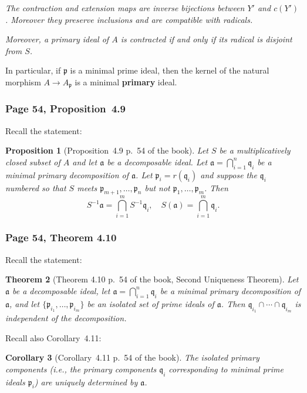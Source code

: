 \documentclass[12pt,letterpaper]{article}%
\newcommand{\mf}{\mathfrak}
\newcommand{\aaa}{\mf a}
\newcommand{\ppp}{\mf p}
\newcommand{\qqq}{\mf q}
\newcommand{\nn}{\noindent}
\newtheorem{thm}{Theorem}%
\newtheorem{cor}[thm]{Corollary}
\newtheorem{prop}[thm]{Proposition}
\begin{document}
\nn\emph{The contraction and extension maps are inverse bijections between $Y'$ and $c(Y')$. Moreover they preserve inclusions and are compatible with radicals.} 

\nn\emph{Moreover, a primary ideal of $A$ is contracted if and only if its radical is disjoint from $S$.}

In particular, if $\ppp$ is a minimal prime ideal, then the kernel of the natural morphism $A\to A_\ppp$ is a minimal \textbf{primary} ideal.


\subsubsection{Page 54, Proposition~4.9}%

Recall the statement:

\begin{prop}[Proposition~4.9 p.~54 of the book]\label{p4.9}
Let $S$ be a multiplicatively closed subset of $A$ and let $\aaa$ be a decomposable ideal. Let $\aaa=\bigcap_{i=1}^n\qqq_i$ be a minimal primary decomposition of $\aaa$. Let $\ppp_i=r(\qqq_i)$ and suppose the $\qqq_i$ numbered so that $S$ meets $\ppp_{m+1},\ldots,\ppp_n$ but not $\ppp_1,\ldots,\ppp_m$. Then
$$
S^{-1}\aaa=\bigcap_{i=1}^mS^{-1}\qqq_i,\quad S(\aaa)=\bigcap_{i=1}^m\qqq_i.
$$
\end{prop}

\subsubsection{Page 54, Theorem 4.10}%
Recall the statement:

\begin{thm}[Theorem 4.10 p.~54 of the book, Second Uniqueness Theorem]
Let $\aaa$ be a decomposable ideal, let $\aaa=\bigcap_{i=1}^n\qqq_i$ be a minimal primary decomposition of $\aaa$, and let $\{\ppp_{i_1},\ldots,\ppp_{i_m}\}$ be an isolated set of prime ideals of $\aaa$. Then $\qqq_{i_1}\cap\cdots\cap\qqq_{i_m}$ is independent of the decomposition.
\end{thm}

Recall also Corollary~4.11:

\begin{cor}[Corollary~4.11 p.~54 of the book]\label{c2.11}
The isolated primary components (i.e., the primary components $\qqq_i$ corresponding to minimal prime ideals $\ppp_i$) are uniquely determined by $\aaa$.
\end{cor}
\end{document}
